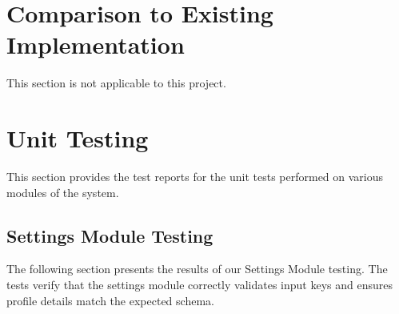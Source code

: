 \documentclass[12pt, titlepage]{article}
\begin{document}
\begin{table}[H]
  \caption{\bf Reusability Testing Evaluation Results}
  \label{table:Reusability_Tests}
\end{table}
	
\section{Comparison to Existing Implementation}	

This section is not applicable to this project.

\section{Unit Testing}

This section provides the test reports for the unit tests performed on various modules of the system.

\subsection{Settings Module Testing}

The following section presents the results of our Settings Module testing. The tests verify that the settings module correctly validates input keys and ensures profile details match the expected schema.
\end{document}

